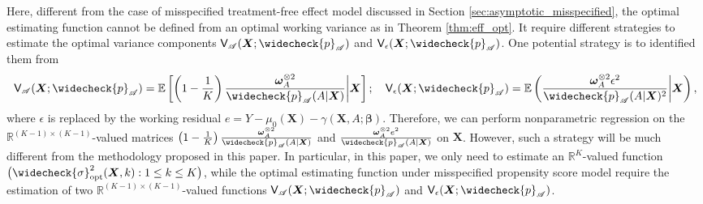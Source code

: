 \documentclass[11pt]{article}
\numberwithin{equation}{section}
\theoremstyle{definition}
\theoremstyle{remark}
\newcommand{\bX}{\bm{X}}
\newcommand{\bbeta}{\bm{\beta}}
\newcommand{\bomega}{\bm{\omega}}
\newcommand{\bbE}{\mathbb{E}}
\newcommand{\bbR}{\mathbb{R}}
\newcommand{\sA}{\mathscr{A}}
\newcommand{\sfV}{\mathsf{V}}
\newcommand{\opt}{\mathrm{opt}}
\begin{document}
Here, different from the case of misspecified treatment-free effect model discussed in Section \ref{sec:asymptotic_misspecified}, the optimal estimating function cannot be defined from an optimal working variance as in Theorem \ref{thm:eff_opt}. It require different strategies to estimate the optimal variance components $ \sfV_{\sA}(\bX;\widecheck{p}_{\sA}) $ and $ \sfV_{\epsilon}(\bX;\widecheck{p}_{\sA}) $. One potential strategy is to identified them from
\[ \sfV_{\sA}(\bX;\widecheck{p}_{\sA}) = \bbE\left[ \left( 1-{1 \over K} \right){\bomega_{A}^{\otimes 2} \over \widecheck{p}_{\sA}(A|\bX)}\middle|\bX \right]; \quad \sfV_{\epsilon}(\bX;\widecheck{p}_{\sA}) = \bbE\left( {\bomega_{A}^{\otimes 2} \epsilon^{2} \over \widecheck{p}_{\sA}(A|\bX)^{2}}\middle|\bX \right), \]
where $ \epsilon $ is replaced by the working residual $ e = Y - \mu_{0}(\bX) - \gamma(\bX,A;\bbeta) $. Therefore, we can perform nonparametric regression on the $ \bbR^{(K-1)\times(K-1)} $-valued matrices $ \left( 1 - {1 \over K} \right){\bomega_{A}^{\otimes 2} \over \widecheck{p}_{\sA}(A|\bX)} $ and $ {\bomega_{A}^{\otimes 2}e^{2} \over \widecheck{p}_{\sA}(A|\bX)} $ on $ \bX $. However, such a strategy will be much different from the methodology proposed in this paper. In particular, in this paper, we only need to estimate an $ \bbR^{K} $-valued function $ \big( \widecheck{\sigma}_{\opt}^{2}(\bX,k): 1 \le k \le K \big) $, while the optimal estimating function under misspecified propensity score model require the estimation of two $ \bbR^{(K-1)\times(K-1)} $-valued functions $ \sfV_{\sA}(\bX;\widecheck{p}_{\sA}) $ and $ \sfV_{\epsilon}(\bX;\widecheck{p}_{\sA}) $.

\newpage
\end{document}
